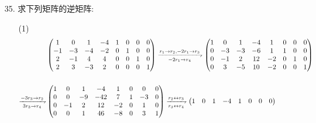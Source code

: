 \documentclass{article}
\begin{document}
\begin{enumerate}
\begin{proof}
\begin{enumerate}
\begin{align*}
            \\
            T_{ji}(1)T_{ij}(-1)T_{ji}(1)
            &=(I+E_{ji})(I-E_{ij})(I+E_{ji})\\
            &=(I+E_{ji}-E_{ij}-E_{jj})(I+E_{ji})\\
            &=I-E_{ii}-E_{jj}-E_{ij}+E_{ji}.
        \end{align*}
        即证:\[D_{i}(-1)S_{ij}=S_{ij}D_{j}(-1)=T_{ji}(1)T_{ij}(-1)T_{ji}(1).\]
    \end{enumerate}    
    \end{proof}
    \item [35.]求下列矩阵的逆矩阵:
    \begin{enumerate}
        \item [(1)]
        \begin{align*}
            &\begin{pmatrix}
                1  &  0 & 1  & -4 & 1 & 0 & 0 & 0\\
                -1 & -3 & -4 & -2 & 0 & 1 & 0 & 0\\
                2  & -1 & 4  & 4  & 0 & 0 & 1 & 0\\
                2  &  3 & -3 & 2  & 0 & 0 & 0 & 1
            \end{pmatrix}
            \xrightharpoondown[-2r_1 \to r_4]{r_1 \to r_2,-2r_1 \to r_3}
            \begin{pmatrix}
                1  &  0 & 1  & -4 & 1  & 0 & 0 & 0\\
                0  & -3 & -3 & -6 & 1  & 1 & 0 & 0\\
                0  & -1 & 2  & 12 & -2 & 0 & 1 & 0\\
                0  &  3 & -5 & 10 & -2 & 0 & 0 & 1
            \end{pmatrix}\\ &\\
            \xrightharpoondown[3r_3 \to r_4]{-3r_3 \to r_2}
            &\begin{pmatrix}
                1  &  0 & 1  & -4 & 1  & 0 & 0 & 0\\
                0  &  0 & -9 & -42& 7  & 1 & -3& 0\\
                0  & -1 & 2  & 12 & -2 & 0 & 1 & 0\\
                0  &  0 & 1  & 46 & -8 & 0 & 3 & 1
            \end{pmatrix}
            \xrightharpoondown[r_3 \leftrightarrow r_4]{r_2 \leftrightarrow r_3}
            \begin{pmatrix}
                1  &  0 & 1  & -4 & 1  & 0 & 0 & 0\\

\end{pmatrix}
\end{align*}
\end{enumerate}
\end{enumerate}
\end{document}
